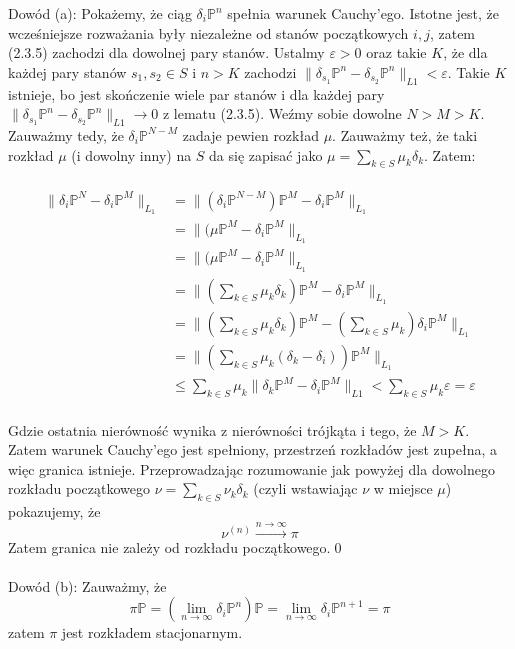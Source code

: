 \documentclass[a4paper]{article}
\begin{document}
Dowód (a): Pokażemy, że ciąg $\delta_i\mathbb{P}^n$ spełnia warunek Cauchy'ego. Istotne jest, że wcześniejsze rozważania były niezależne od stanów początkowych $i, j$, zatem (2.3.5) zachodzi dla dowolnej pary stanów. Ustalmy $\varepsilon > 0$ oraz takie $K$, że dla każdej pary stanów $s_1, s_2 \in S$ i $n > K$  zachodzi $\|\delta_{s_1}\mathbb{P}^n - \delta_{s_2}\mathbb{P}^n\|_{L1} < \varepsilon$. Takie $K$ istnieje, bo jest skończenie wiele par stanów i dla każdej pary $\|\delta_{s_1}\mathbb{P}^n - \delta_{s_2}\mathbb{P}^n\|_{L1} \to 0$ z lematu (2.3.5). Weźmy sobie dowolne $N > M > K$. Zauważmy tedy, że $\delta_i\mathbb{P}^{N-M}$ zadaje pewien rozkład $\mu$. Zauważmy też, że taki rozkład $\mu$ (i dowolny inny) na $S$ da się zapisać jako $\mu = \sum\limits_{k \in S} \mu_k\delta_k$. Zatem:\\\\
\begin{align*}
\|\delta_i\mathbb{P}^N - \delta_i\mathbb{P}^M\|_{L_1} &= \|(\delta_i\mathbb{P}^{N-M})\mathbb{P}^{M} - \delta_i\mathbb{P}^M\|_{L_1}\\
&= \|(\mu\mathbb{P}^{M} - \delta_i\mathbb{P}^M\|_{L_1} \\
&= \|(\mu\mathbb{P}^{M} - \delta_i\mathbb{P}^M\|_{L_1} \\
&= \|(\sum\limits_{k \in S} \mu_k\delta_k)\mathbb{P}^{M} - \delta_i\mathbb{P}^M\|_{L_1} \\
&= \|(\sum\limits_{k \in S} \mu_k\delta_k)\mathbb{P}^{M} - (\sum\limits_{k \in S} \mu_k)\delta_i\mathbb{P}^M\|_{L_1} \\
&= \|(\sum\limits_{k \in S} \mu_k(\delta_k - \delta_i))\mathbb{P}^{M}\|_{L_1}  \\
&\leq  \sum\limits_{k \in S} \mu_k\|\delta_k\mathbb{P}^M - \delta_i\mathbb{P}^M\|_{L1} < \sum\limits_{k \in S} \mu_k\varepsilon = \varepsilon
\end{align*}
\\
Gdzie ostatnia nierówność wynika z nierówności trójkąta i tego, że $M > K$. Zatem warunek Cauchy'ego jest spełniony, przestrzeń rozkładów jest zupełna, a więc granica istnieje. Przeprowadzając rozumowanie jak powyżej dla dowolnego rozkładu początkowego $\nu = \sum\limits_{k \in S} \nu_k\delta_k$ (czyli wstawiając $\nu$ w miejsce $\mu$) pokazujemy, że $$\nu^{(n)} \xrightarrow{n \to \infty} \pi$$ Zatem granica nie zależy od rozkładu początkowego.\qed \\\\
Dowód (b): Zauważmy, że $$\pi\mathbb{P} = (\lim\limits_{n \to \infty} \delta_i\mathbb{P}^n)\mathbb{P} = \lim\limits_{n \to \infty} \delta_i\mathbb{P}^{n+1} = \pi$$ zatem $\pi$ jest rozkładem stacjonarnym.
\end{document}
